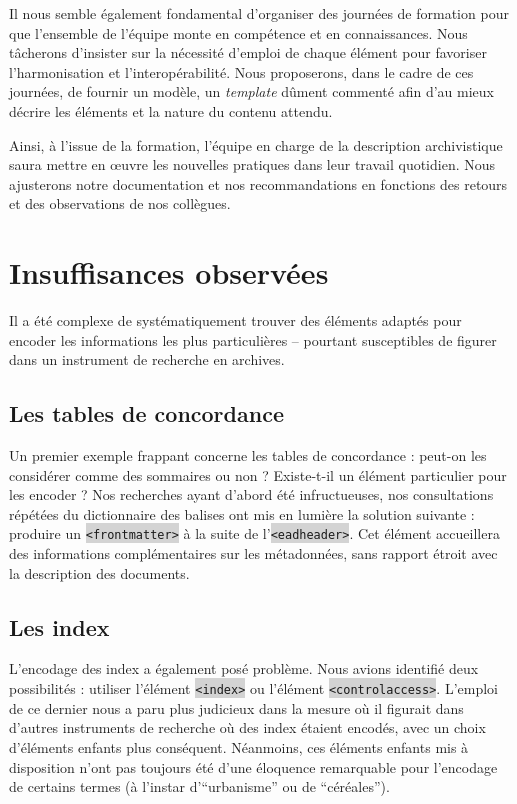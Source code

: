 \documentclass[hidelinks, 13pt]{report}
\newcommand{\code}[1]{\colorbox{LightGray}{\texttt{#1}}}
\begin{document}
	Il nous semble également fondamental d'organiser des journées de formation pour que l'ensemble de l'équipe monte en compétence et en connaissances. Nous tâcherons d'insister sur la nécessité d'emploi de chaque élément pour favoriser l'harmonisation et l'interopérabilité. Nous proposerons, dans le cadre de ces journées, de fournir un modèle, un \textit{template} dûment commenté afin d'au mieux décrire les éléments et la nature du contenu attendu.
	
	Ainsi, à l'issue de la formation, l'équipe en charge de la description archivistique saura mettre en œuvre les nouvelles pratiques dans leur travail quotidien. Nous ajusterons notre documentation et nos recommandations en fonctions des retours et des observations de nos collègues.
	
	
	
	
	
	
	
	


	\chapter{Insuffisances observées}
	
	Il a été complexe de systématiquement trouver des éléments adaptés pour encoder les informations les plus particulières -- pourtant susceptibles de figurer dans un instrument de recherche en archives.
			
	\section{Les tables de concordance}
	
	Un premier exemple frappant concerne les tables de concordance : peut-on les considérer comme des sommaires ou non ? Existe-t-il un élément particulier pour les encoder ? Nos recherches ayant d'abord été infructueuses, nos consultations répétées du dictionnaire des balises ont mis en lumière la solution suivante : produire un \code{<frontmatter>} à la suite de l'\code{<eadheader>}. Cet élément accueillera des informations complémentaires sur les métadonnées, sans rapport étroit avec la description des documents.
	
	\section{Les index}
	
	L'encodage des index a également posé problème. Nous avions identifié deux possibilités : utiliser l'élément \code{<index>} ou l'élément \code{<controlaccess>}. L'emploi de ce dernier nous a paru plus judicieux dans la mesure où il figurait dans d'autres instruments de recherche où des index étaient encodés, avec un choix d'éléments enfants plus conséquent. Néanmoins, ces éléments enfants mis à disposition n'ont pas toujours été d'une éloquence remarquable pour l'encodage de certains termes (à l'instar d'\enquote{urbanisme} ou de \enquote{céréales}).
	
\end{document}
